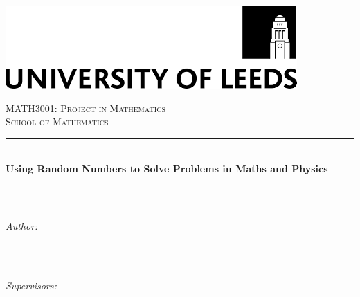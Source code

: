 \documentclass[a4paper]{article}
\begin{document}

\begin{titlepage}

\raggedleft
\includegraphics[scale=0.4]{Logo.png}\\

\vspace{3cm}
\begin{center}
\newcommand{\HRule}{\rule{\linewidth}{0.5mm}}
\textsc{\Large MATH3001: Project in Mathematics}\\[2.0mm]
\textsc{\Large School of Mathematics}\\[2.0mm]
\vspace{0.5cm}

	\HRule\\[0.4cm]

	{\huge\bfseries Using Random Numbers to Solve Problems in Maths and Physics}\\[0.4cm] 

	\HRule\\[1.5cm]

		\begin{minipage}{0.4\textwidth}
		\begin{flushleft}
			\large
			\textit{Author:}\\
			 \\
		\end{flushleft}
	\end{minipage}
	~
	\begin{minipage}{0.4\textwidth}
		\begin{flushright}
			\large
			\textit{Supervisors:}\\
			 \\
		\end{flushright}
	\end{minipage}
\mbox{}
\vfill
{}

\end{center}
\end{titlepage}


\tableofcontents
\end{document}
